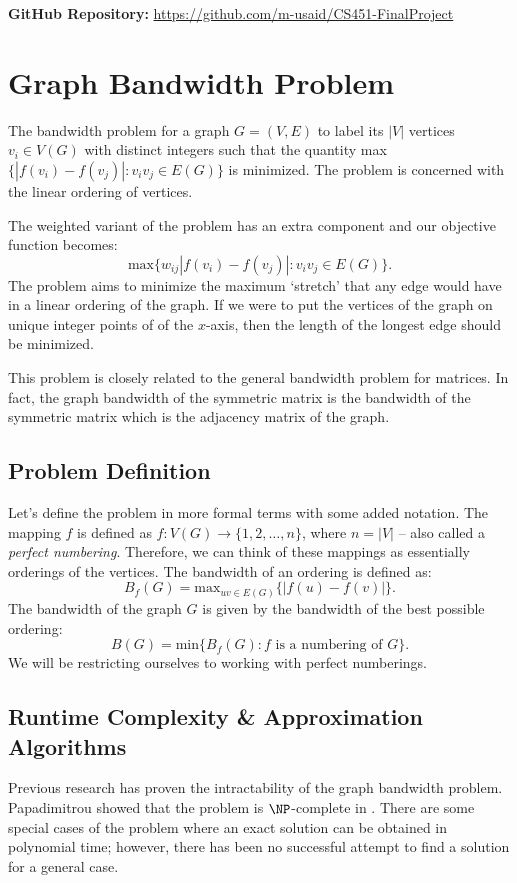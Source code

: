 \documentclass[a4paper,11pt]{article}
\begin{document}
\textbf{GitHub Repository:} \url{https://github.com/m-usaid/CS451-FinalProject}

\section{Graph Bandwidth Problem}

The bandwidth problem for a graph $G = (V,E)$ to label its $|V|$ vertices $v_i \in V(G)$ with distinct integers such that the quantity max$\{|f(v_i) - f(v_j)|: v_iv_j \in E(G)\}$ is minimized. The problem is concerned with the linear ordering of vertices. 

The weighted variant of the problem has an extra component and our objective function becomes:
\[\text{max}\{w_{ij}|f(v_i)-f(v_j)| : v_iv_j \in E(G)\}.\]
The problem aims to minimize the maximum `stretch' that any edge would have in a linear ordering of the graph. If we were to put the vertices of the graph on unique integer points of
of the $x$-axis, then the length of the longest edge should be minimized. 

This problem is closely related to the general bandwidth problem for matrices. In fact, the graph bandwidth of the symmetric matrix is the bandwidth of the symmetric matrix which is the adjacency matrix of the graph.


\subsection{Problem Definition}
Let's define the problem in more formal terms with some added notation. 
The mapping $f$ is defined as $f: V(G) \to \{1, 2, \dots, n\}$, where $n = |V|$ -- also called a \emph{perfect numbering}. \cite{Lee2016} Therefore, 
we can think of these mappings as essentially orderings of the vertices. The bandwidth of an ordering is defined as:
\[B_f(G) = \text{max}_{uv \in E(G)}\{|f(u) - f(v)|\}.\]
The bandwidth of the graph $G$ is given by the bandwidth of the best possible ordering:
\[B(G) = \text{min}\{B_f(G): f \text{ is a numbering of }G\}.\]
We will be restricting ourselves to working with perfect numberings.

\newpage
\subsection{Runtime Complexity \& Approximation Algorithms}
Previous research has proven the intractability of the graph bandwidth problem. Papadimitrou showed that the problem is $\NP$-complete in \cite{papadimitriou_1976}. There are some special cases of the problem where an exact solution can be obtained in polynomial time; however, there has been no successful attempt to find a solution for a general case. 
\end{document}
